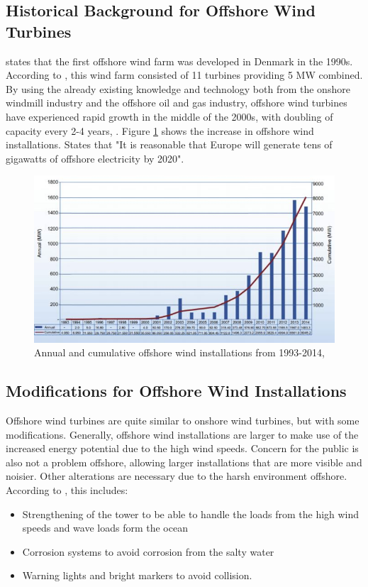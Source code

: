 \subsection{Historical Background for Offshore Wind Turbines}
\cite{NG2016} states that the first offshore wind farm was developed in Denmark in the 1990s. According to \cite{Lynn2011}, this wind farm consisted of 11 turbines providing 5 MW combined.  By using the already existing knowledge and technology both from the onshore windmill industry and the offshore oil and gas industry, offshore wind turbines have experienced rapid growth in the middle of the 2000s, with doubling of capacity every 2-4 years, \cite{NG2016}. Figure \ref{fig:development} shows the increase in offshore wind installations. \cite{Lynn2011} States that "It is reasonable that Europe will generate tens of gigawatts of offshore electricity by 2020".


\begin{figure}[H]
\centering
\includegraphics[scale=1.1]{figures/development}
\caption[$\; \:$Annual and cumulative offshore wind installations from 1993-2014]{Annual and cumulative offshore wind installations from 1993-2014, \cite{NG2016}}
 \label{fig:development}
\end{figure}


\subsection{Modifications for Offshore Wind Installations}
Offshore wind turbines are quite similar to onshore wind turbines, but with some modifications. Generally, offshore wind installations are larger to make use of the increased energy potential due to the high wind speeds. Concern for the public is also not a problem offshore, allowing larger installations that are more visible and noisier. Other alterations are necessary due to the harsh environment offshore. According to \cite{Kapsali2012}, this includes:
\begin{itemize}
    \item Strengthening of the tower to be able to handle the loads from the high wind speeds and wave loads form the ocean
    \item Corrosion systems to avoid corrosion from the salty water
    \item Warning lights and bright markers to avoid collision. 
\end{itemize}

